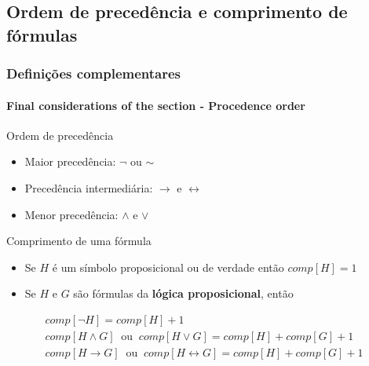 \documentclass[10pt, headsepline, captions=tableabove, xcolor=table]{beamer}
\begin{document}
\subsection{Ordem de precedência e comprimento de fórmulas}
%
\begin{frame}[t]
    \frametitle{Definições complementares}
    \framesubtitle{Final considerations of the section - Procedence order}
    \small
    \begin{block}{Ordem de precedência}
        \begin{itemize}
            \item Maior precedência: $\lnot$ ou $\sim$ 
            \item Precedência intermediária: $\rightarrow$ e $\leftrightarrow$
            \item Menor precedência: $\land$ e $\lor$
        \end{itemize}        
    \end{block}
    \pause
    \begin{block}{Comprimento de uma fórmula}
        \begin{itemize}
            \item Se $H$ é um símbolo proposicional ou de verdade então $comp[H]=1$
            \item Se $H$ e $G$ são fórmulas da \textbf{lógica proposicional}, então
        \end{itemize}
        \begin{gather*}
            comp[\lnot H] = comp[H] + 1 \\
            comp[H \land G]~\text{ ou }~comp[H \lor G] = comp[H] + comp[G] + 1 \\
            comp[H \rightarrow G]~\text{ ou }~comp[H \leftrightarrow G] = comp[H] + comp[G] + 1
        \end{gather*}
    \end{block}
\end{frame}
%
\end{document}
